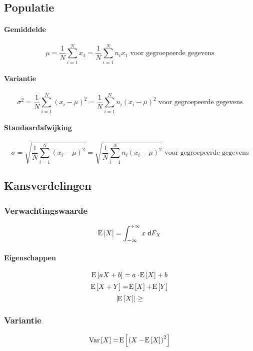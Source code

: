 \subsection{Populatie}
\label{sec:Populatie}
  \paragraph{Gemiddelde}
  \label{sec:GemiddeldePopulatie}
  \[
      \mu = \frac{1}{N}\sum^N_{i=1} x_1
          = \frac{1}{N}\sum^N_{i=1} n_i x_1 \mbox{ voor gegroepeerde gegevens}
  \]

  \paragraph{Variantie}
  \label{sec:VariantiePopulatie}
  \[
      \sigma^2 = \frac{1}{N} \sum^N_{i=1} \left(x_i-\mu\right)^2
               = \frac{1}{N} \sum^N_{i=1} n_i\left(x_i-\mu\right)^2 \mbox{ voor gegroepeerde gegevens}
  \]

  \paragraph{Standaardafwijking}
  \label{sec:StandaardafwijkingPopulatie}
  \[
      \sigma = \sqrt{\frac{1}{N} \sum^N_{i=1} \left(x_i-\mu\right)^2}
             = \sqrt{\frac{1}{N} \sum^N_{i=1} n_i\left(x_i-\mu\right)^2} \mbox{ voor gegroepeerde gegevens}
  \]



\subsection{Kansverdelingen}
\label{sec:Kansverdelingen}

  \subsubsection{Verwachtingswaarde}
  \[
    \!\mathrm{E}\left[ X \right] = \int_{-\infty}^{+\infty} x \;\textsf{d}F_X
  \]
  \paragraph{Eigenschappen}
  \[
    \!\mathrm{E}\left[ aX+b \right] = a \cdot \!\mathrm{E}\left[ X \right] + b
  \]
  \[
    \!\mathrm{E}\left[ X + Y \right] = \!\mathrm{E}\left[ X \right] + \!\mathrm{E}\left[ Y \right]
  \]
  \[
    \left| \!\mathrm{E}\left[ X \right] \right| \geq
  \]

  \subsubsection{Variantie}
  \[
    \!\mathrm{Var}\left[ X \right] = \!\mathrm{E}\left[ \left(X - \!\mathrm{E}\left[ X \right] \right)^2 \right]
  \]


